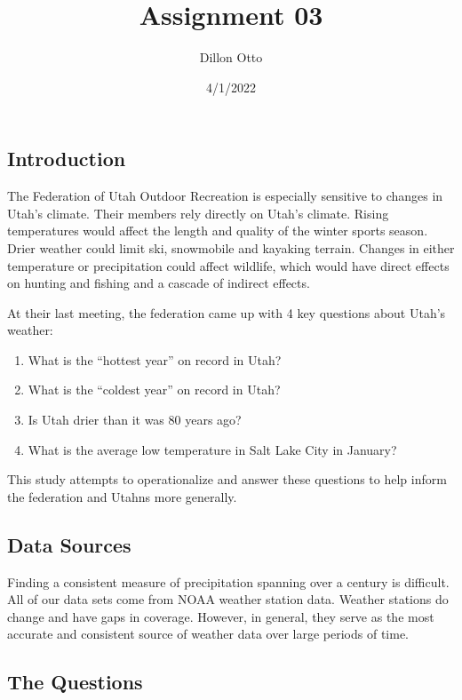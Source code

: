 \documentclass[
]{article}
\title{Assignment 03}
\author{Dillon Otto}
\date{4/1/2022}
\providecommand{\tightlist}{%
  \setlength{\itemsep}{0pt}\setlength{\parskip}{0pt}}
\begin{document}
\maketitle

\hypertarget{introduction}{%
\subsection{Introduction}\label{introduction}}

The Federation of Utah Outdoor Recreation is especially sensitive to
changes in Utah's climate. Their members rely directly on Utah's
climate. Rising temperatures would affect the length and quality of the
winter sports season. Drier weather could limit ski, snowmobile and
kayaking terrain. Changes in either temperature or precipitation could
affect wildlife, which would have direct effects on hunting and fishing
and a cascade of indirect effects.

At their last meeting, the federation came up with 4 key questions about
Utah's weather:

\begin{enumerate}
\def\labelenumi{\arabic{enumi}.}
\tightlist
\item
  What is the ``hottest year'' on record in Utah?
\item
  What is the ``coldest year'' on record in Utah?
\item
  Is Utah drier than it was 80 years ago?
\item
  What is the average low temperature in Salt Lake City in January?
\end{enumerate}

This study attempts to operationalize and answer these questions to help
inform the federation and Utahns more generally.

\hypertarget{data-sources}{%
\subsection{Data Sources}\label{data-sources}}

Finding a consistent measure of precipitation spanning over a century is
difficult. All of our data sets come from NOAA weather station data.
Weather stations do change and have gaps in coverage. However, in
general, they serve as the most accurate and consistent source of
weather data over large periods of time.

\hypertarget{the-questions}{%
\subsection{The Questions}\label{the-questions}}
\end{document}
